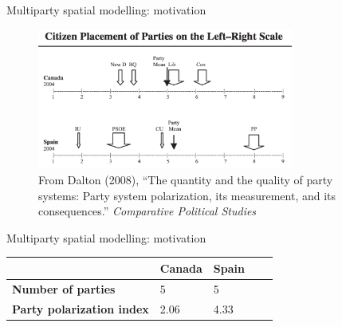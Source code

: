 \documentclass[11pt,aspectratio=169]{beamer}
\begin{document}
\begin{frame}{Multiparty spatial modelling: motivation}

\begin{figure}
\centering
\includegraphics[width=0.75\textwidth]{dalton.png}
\caption{From Dalton (2008), ``The quantity and the quality of party systems: Party system polarization, its measurement, and its consequences.'' \textit{Comparative Political Studies}}
\end{figure}

\end{frame}
\begin{frame}{Multiparty spatial modelling: motivation}



\begin{table}[]
\begin{tabular}{@{}lllll@{}}
\toprule
                                  & \textbf{Canada}         & \textbf{Spain}              &  &  \\ \midrule
\textbf{Number of parties}        & 5                       & 5                           &  &  \\
\textbf{Party polarization index} & 2.06                    & 4.33                        &  &  \\ \bottomrule
\end{tabular}
\end{table}

\end{frame}
\end{document}
